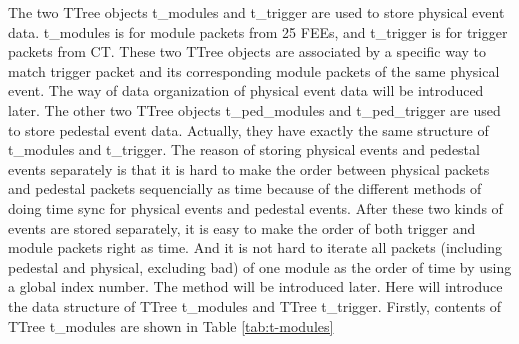 \documentclass[a4paper, 12pt, onecolumn]{article}
\begin{document}
The two TTree objects t\_modules and t\_trigger are used to store physical event data.
t\_modules is for module packets from 25 FEEs, and t\_trigger is for trigger packets from CT.
These two TTree objects are associated by a specific way to match trigger packet and its corresponding module packets of the same physical event.
The way of data organization of physical event data will be introduced later.
The other two TTree objects t\_ped\_modules and t\_ped\_trigger are used to store pedestal event data.
Actually, they have exactly the same structure of t\_modules and t\_trigger.
The reason of storing physical events and pedestal events separately is that it is hard to make the order between physical packets and pedestal packets sequencially as time 
because of the different methods of doing time sync for physical events and pedestal events.
After these two kinds of events are stored separately, it is easy to make the order of both trigger and module packets right as time.
And it is not hard to iterate all packets (including pedestal and physical, excluding bad) of one module as the order of time by using a global index number.
The method will be introduced later.
Here will introduce the data structure of TTree t\_modules and TTree t\_trigger. Firstly, contents of TTree t\_modules are shown in Table \ref{tab:t-modules}
\end{document}
